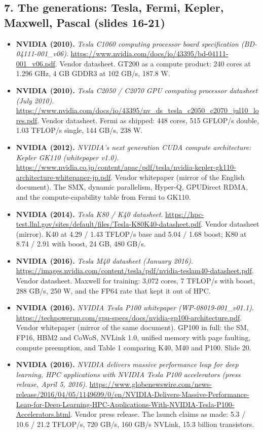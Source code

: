 \subsection*{7. The generations: Tesla, Fermi, Kepler, Maxwell, Pascal (slides 16-21)}
\begin{itemize}[leftmargin=1.2em,itemsep=3pt]\sloppy
\item \textbf{NVIDIA (2010).} \textit{Tesla C1060 computing processor board specification (BD-04111-001\_v06)}. \url{https://www.nvidia.com/docs/io/43395/bd-04111-001_v06.pdf}. Vendor datasheet. GT200 as a compute product: 240 cores at 1.296 GHz, 4 GB GDDR3 at 102 GB/s, 187.8 W.
\item \textbf{NVIDIA (2010).} \textit{Tesla C2050 / C2070 GPU computing processor datasheet (July 2010)}. \url{https://www.nvidia.com/docs/io/43395/nv_ds_tesla_c2050_c2070_jul10_lores.pdf}. Vendor datasheet. Fermi as shipped: 448 cores, 515 GFLOP/s double, 1.03 TFLOP/s single, 144 GB/s, 238 W.
\item \textbf{NVIDIA (2012).} \textit{NVIDIA's next generation CUDA compute architecture: Kepler GK110 (whitepaper v1.0)}. \url{https://www.nvidia.co.jp/content/apac/pdf/tesla/nvidia-kepler-gk110-architecture-whitepaper-jp.pdf}. Vendor whitepaper (mirror of the English document). The SMX, dynamic parallelism, Hyper-Q, GPUDirect RDMA, and the compute-capability table from Fermi to GK110.
\item \textbf{NVIDIA (2014).} \textit{Tesla K80 / K40 datasheet}. \url{https://hpc-test.llnl.gov/sites/default/files/Tesla-K80K40-datasheet.pdf}. Vendor datasheet (mirror). K40 at 4.29 / 1.43 TFLOP/s base and 5.04 / 1.68 boost; K80 at 8.74 / 2.91 with boost, 24 GB, 480 GB/s.
\item \textbf{NVIDIA (2016).} \textit{Tesla M40 datasheet (January 2016)}. \url{https://images.nvidia.com/content/tesla/pdf/nvidia-teslam40-datasheet.pdf}. Vendor datasheet. Maxwell for training: 3,072 cores, 7 TFLOP/s with boost, 288 GB/s, 250 W, and the FP64 rate that kept it out of HPC.
\item \textbf{NVIDIA (2016).} \textit{NVIDIA Tesla P100 whitepaper (WP-08019-001\_v01.1)}. \url{https://techpowerup.com/gpu-specs/docs/nvidia-gp100-architecture.pdf}. Vendor whitepaper (mirror of the same document). GP100 in full: the SM, FP16, HBM2 and CoWoS, NVLink 1.0, unified memory with page faulting, compute preemption, and Table 1 comparing K40, M40 and P100. Slide 20.
\item \textbf{NVIDIA (2016).} \textit{NVIDIA delivers massive performance leap for deep learning, HPC applications with NVIDIA Tesla P100 accelerators (press release, April 5, 2016)}. \url{https://www.globenewswire.com/news-release/2016/04/05/1149699/0/en/NVIDIA-Delivers-Massive-Performance-Leap-for-Deep-Learning-HPC-Applications-With-NVIDIA-Tesla-P100-Accelerators.html}. Vendor press release. The launch claims as made: 5.3 / 10.6 / 21.2 TFLOP/s, 720 GB/s, 160 GB/s NVLink, 15.3 billion transistors.

\end{itemize}
